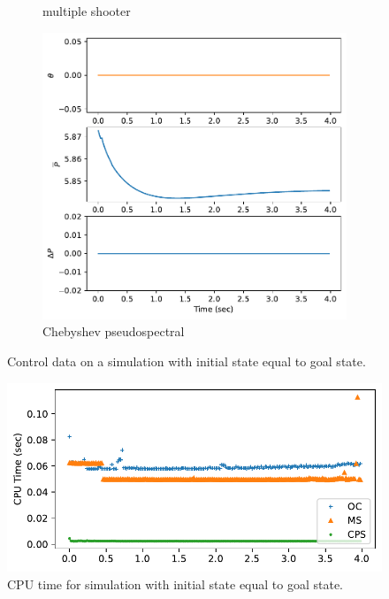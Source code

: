 \documentclass[]{article}
\begin{document}
\begin{figure}[H]
\begin{subfigure}[b]{0.3\textwidth}
		\caption{multiple shooter}
	\end{subfigure}
	\begin{subfigure}[b]{0.3\textwidth}
		\centering
		\includegraphics[width=\textwidth]{controlhover5.pdf}
		\caption{Chebyshev pseudospectral}
	\end{subfigure}
	\caption{Control data on a simulation with initial state equal to goal state.}
	\label{fig:controlhover}
\end{figure}


\begin{figure}[H]
	\centering
	\includegraphics[width=\textwidth]{timehover.pdf}
	\caption{CPU time for simulation with initial state equal to goal state.}
	\label{fig:timehover}
\end{figure}
\end{document}
